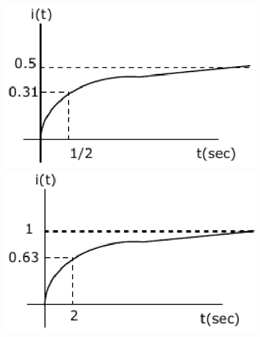 \documentclass[journal,12pt,twocolumn]{IEEEtran}
\begin{document}
\begin{enumerate}
\begin{figure}[!h]
\begin{center}
\includegraphics[scale=0.7]{./figs/fig54d.eps}
\includegraphics[scale=0.7]{./figs/fig54e.eps}
\caption{}
\label{fig54}
\end{center}
\end{figure}


\end{enumerate}
\end{document}
